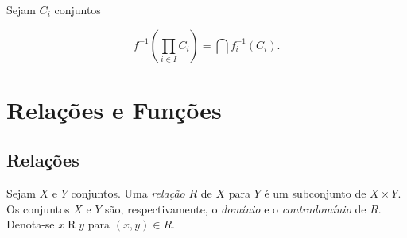 \begin{prop}
	Sejam $C_i$ conjuntos 
	
	\begin{equation*}
	f^{-1}\left( \prod_{i \in I} {C_i} \right) = \bigcap f_i^{-1} (C_i).
	\end{equation*}
\end{prop}










\chapter{Relações e Funções}

\section{Relações}

\begin{defi}
Sejam $X$ e $Y$ conjuntos. Uma \emph{relação} $R$ de $X$ para $Y$ é um subconjunto de $X \times Y$. Os conjuntos $X$ e $Y$ são, respectivamente, o \emph{domínio} e o \emph{contradomínio} de $R$. Denota-se $x \mathrel{R} y$ para $(x,y) \in R$.
\end{defi}

